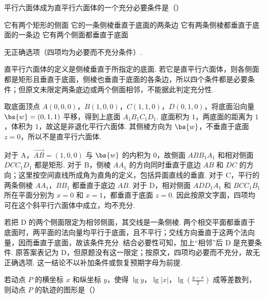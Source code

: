 \begin{problem}

平行六面体成为直平行六面体的一个充分必要条件是（\quad）

\choices
{它有两个矩形的侧面}
{它的一条侧棱垂直于底面的两条边}
{它有两条侧棱都垂直于底面的一条边}
{它有两个侧面都垂直于底面}
\end{problem}

\begin{answer}
无正确选项（四项均为必要而不充分条件）.
\end{answer}

\begin{solution}
直平行六面体的定义是侧棱垂直于所指定的底面. 若它是直平行六面体，则各侧面都是矩形且垂直于底面，侧棱也垂直于底面的各条边，所以四个条件都是必要条件；但原文未限定两条底边或两个侧面相邻，不能据此判定充分性.

取底面顶点 \(A\left(0,0,0\right)\)，\(B\left(1,0,0\right)\)，\(C\left(1,1,0\right)\)，\(D\left(0,1,0\right)\)，将底面沿向量 \(\bs{w}=\left(0,1,1\right)\) 平移，得到上底面 \(A_1B_1C_1D_1\). 底面积为 \(1\)，两底面的距离为 \(1\)，体积为 \(1\)，故这是非退化平行六面体. 其侧棱方向为 \(\bs{w}\)，不垂直于底面 \(z=0\)，所以不是直平行六面体.

对于 A，\(\overrightarrow{AB}=\left(1,0,0\right)\) 与 \(\bs{w}\) 的内积为 \(0\)，故侧面 \(ABB_1A_1\) 和相对侧面 \(DCC_1D_1\) 都是矩形. 对于 B，侧棱 \(AA_1\) 的方向同时垂直于底边 \(AB\) 和 \(DC\) 的方向；这里按空间直线所成角为直角的定义，包括异面直线的垂直. 对于 C，平行的两条侧棱 \(AA_1\)，\(BB_1\) 都垂直于底边 \(AB\). 对于 D，相对侧面 \(ADD_1A_1\) 和 \(BCC_1B_1\) 所在平面分别为 \(x=0\) 和 \(x=1\)，都垂直于底面 \(z=0\). 因此按原文字面，四项均可在这个斜平行六面体中成立，均不充分.

若把 D 的两个侧面限定为相邻侧面，其交线是一条侧棱. 两个相交平面都垂直于底面时，两平面的法向量均平行于底面，且不平行；交线方向垂直于这两个法向量，因而垂直于底面，故该条件充分. 结合必要性可知，加上“相邻”后 D 是充要条件. 原答案表记为 D，但原题没有这一限定；按原文，四项均必要而不充分，故无正确选项. 这一结论不以补加条件或恢复预期字母为前提.
\end{solution}

\begin{problem}

若动点 \(P\) 的横坐标 \(x\) 和纵坐标 \(y\)，使得 \(\lg y\)，\(\lg|x|\)，\(\lg\left(\frac{y-x}{2}\right)\) 成等差数列，则动点 \(P\) 的轨迹的图形是（\quad）

{}
{}
{}
\end{problem}

